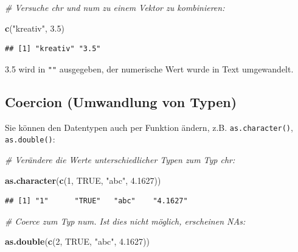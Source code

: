 \documentclass[
  ngerman,
]{book}
\newenvironment{Shaded}{\begin{snugshade}}{\end{snugshade}}
\newcommand{\CommentTok}[1]{\textcolor[rgb]{0.56,0.35,0.01}{\textit{#1}}}
\newcommand{\ConstantTok}[1]{\textcolor[rgb]{0.56,0.35,0.01}{#1}}
\newcommand{\DecValTok}[1]{\textcolor[rgb]{0.00,0.00,0.81}{#1}}
\newcommand{\FloatTok}[1]{\textcolor[rgb]{0.00,0.00,0.81}{#1}}
\newcommand{\FunctionTok}[1]{\textcolor[rgb]{0.13,0.29,0.53}{\textbf{#1}}}
\newcommand{\NormalTok}[1]{#1}
\newcommand{\StringTok}[1]{\textcolor[rgb]{0.31,0.60,0.02}{#1}}
\begin{document}
\begin{Shaded}
\begin{Highlighting}[]
\CommentTok{\# Versuche \textasciigrave{}chr\textasciigrave{} und \textasciigrave{}num\textasciigrave{} zu einem Vektor zu kombinieren:}

\FunctionTok{c}\NormalTok{(}\StringTok{"kreativ"}\NormalTok{, }\FloatTok{3.5}\NormalTok{)  }
\end{Highlighting}
\end{Shaded}

\begin{verbatim}
## [1] "kreativ" "3.5"
\end{verbatim}

3.5 wird in \texttt{""} ausgegeben, der numerische Wert wurde in Text umgewandelt.

\subsection{Coercion (Umwandlung von Typen)}\label{coercion-umwandlung-von-typen}

Sie können den Datentypen auch per Funktion ändern, z.B. \texttt{as.character()}, \texttt{as.double()}:

\begin{Shaded}
\begin{Highlighting}[]
\CommentTok{\# Verändere die Werte unterschiedlicher Typen zum Typ chr:}

\FunctionTok{as.character}\NormalTok{(}\FunctionTok{c}\NormalTok{(}\DecValTok{1}\NormalTok{, }\ConstantTok{TRUE}\NormalTok{, }\StringTok{"abc"}\NormalTok{, }\FloatTok{4.1627}\NormalTok{))}
\end{Highlighting}
\end{Shaded}

\begin{verbatim}
## [1] "1"      "TRUE"   "abc"    "4.1627"
\end{verbatim}

\begin{Shaded}
\begin{Highlighting}[]
\CommentTok{\# Coerce zum Typ num. Ist dies nicht möglich, erscheinen NAs:}

\FunctionTok{as.double}\NormalTok{(}\FunctionTok{c}\NormalTok{(}\DecValTok{2}\NormalTok{, }\ConstantTok{TRUE}\NormalTok{, }\StringTok{"abc"}\NormalTok{, }\FloatTok{4.1627}\NormalTok{))}
\end{Highlighting}
\end{Shaded}
\end{document}
